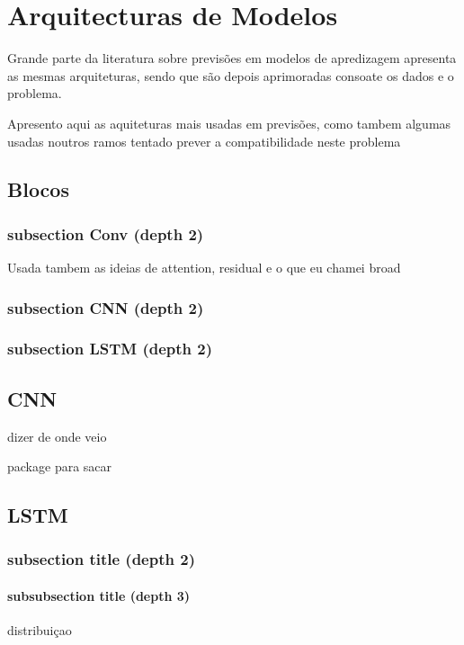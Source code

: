\chapter{Arquitecturas de Modelos}

Grande parte da literatura sobre previsões em modelos de apredizagem apresenta as mesmas arquiteturas, sendo que são depois aprimoradas consoate os dados e o problema.

Apresento aqui as aquiteturas mais usadas em previsões, como tambem algumas usadas noutros ramos tentado prever a compatibilidade neste problema 

\section{Blocos  \label{se:blocos}}

\subsection{subsection Conv (depth 2)}

Usada tambem as ideias de attention, residual e o que eu chamei broad
	
\subsection{subsection CNN (depth 2)}

\subsection{subsection LSTM (depth 2)}

\section{CNN \label{se:dados_crus}}

dizer de onde veio

package para sacar

\section{LSTM  \label{se:dados_estudo}}
\subsection{subsection title (depth 2)}
\subsubsection{subsubsection title (depth 3)}
distribuiçao

